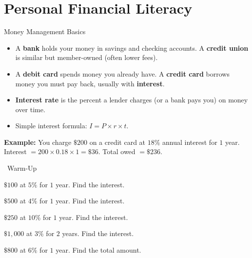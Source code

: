 \section{Personal Financial Literacy}

\begin{quickReview}{Money Management Basics}
\begin{itemize}[leftmargin=*]
    \item A \textbf{bank} holds your money in savings and checking accounts. A \textbf{credit union} is similar but member-owned (often lower fees).
    \item A \textbf{debit card} spends money you already have. A \textbf{credit card} borrows money you must pay back, usually with \textbf{interest}.
    \item \textbf{Interest rate} is the percent a lender charges (or a bank pays you) on money over time.
    \item Simple interest formula: $I = P \times r \times t$.
\end{itemize}

\medskip
\textbf{Example:} You charge $\$200$ on a credit card at $18\%$ annual interest for $1$ year. Interest $= 200 \times 0.18 \times 1 = \$36$. Total owed $= \$236$.
\end{quickReview}

\begin{practiceBox}[funGreen]{\faSun~Warm-Up}


\begin{multicols}{2}
\prob $\$100$ at $5\%$ for $1$ year. Find the interest. \answerBlank[3cm]

\prob $\$500$ at $4\%$ for $1$ year. Find the interest. \answerBlank[3cm]

\prob $\$250$ at $10\%$ for $1$ year. Find the interest. \answerBlank[3cm]

\prob $\$1{,}000$ at $3\%$ for $2$ years. Find the interest. \answerBlank[3cm]

\prob $\$800$ at $6\%$ for $1$ year. Find the total amount. \answerBlank[3cm]
\end{multicols}
\end{practiceBox}

